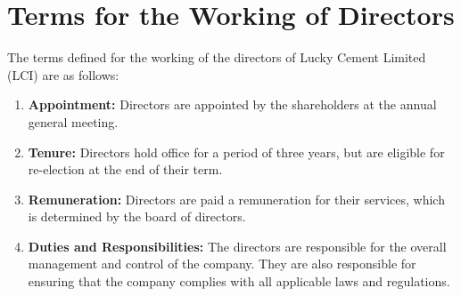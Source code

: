 \documentclass{article}
\begin{document}
\ClearShipoutPictureBG






\newpage

\color{white}


\section{Terms for the Working of Directors}

 \vspace{22pt}
The terms defined for the working of the directors of Lucky Cement Limited (LCI) are as follows:

 \vspace{22pt}
\begin{enumerate}
  \item \textbf{Appointment:} Directors are appointed by the shareholders at the annual general meeting.
  \item \textbf{Tenure:} Directors hold office for a period of three years, but are eligible for re-election at the end of their term.
  \item \textbf{Remuneration:} Directors are paid a remuneration for their services, which is determined by the board of directors.
  \item \textbf{Duties and Responsibilities:} The directors are responsible for the overall management and control of the company. They are also responsible for ensuring that the company complies with all applicable laws and regulations.
\end{enumerate}
\end{document}
